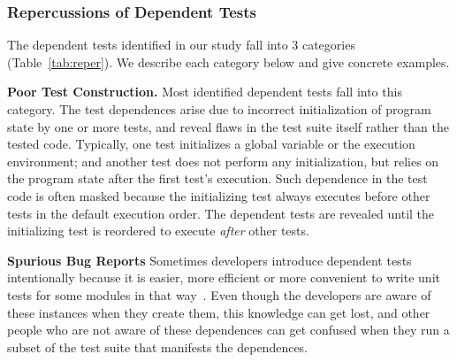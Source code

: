 \subsubsection{Repercussions of Dependent Tests}
\label{sec:repercussion}



The dependent tests identified in our study fall into 3
categories (Table~\ref{tab:reper}). We describe each category below and give
concrete examples. 

\vspace{1mm}

\noindent \textbf{Poor Test Construction.} Most identified
dependent tests fall into this category. The test dependences
arise due to incorrect initialization of program state by one
or more tests, and reveal flaws in the test suite itself
rather than the tested code. Typically, one test initializes
a global variable or the execution environment; and another
test does not perform any initialization, but
relies on the program state after the first test's execution.
Such dependence in the test code is often masked because
the initializing test always executes before other tests in the
default execution order. The dependent tests are revealed
until the initializing test is reordered to execute
\textit{after} other tests. 


\vspace{1mm}

\noindent \textbf{Spurious Bug Reports}
Sometimes developers introduce dependent tests intentionally because it is
easier, more efficient or more convenient to write unit tests for some modules
in that way~\cite{kapfhammeretal:FSE:2003, whittakeretal:2012}.
Even though the developers are aware of these instances
when they create them, this knowledge can get lost, 
and other people who are not aware of these dependences can get confused 
when they run a subset of the test suite that manifests the
dependences.


